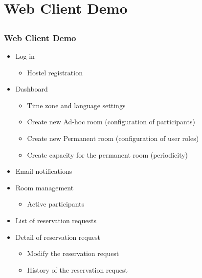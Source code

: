 \documentclass{beamer}
\begin{document}
\section{Web Client Demo}\subsection{}

\begin{frame}
  \frametitle{Web Client Demo}
  \begin{itemize}
    \item Log-in
      \begin{itemize}
        \item Hostel registration    
      \end{itemize}
    \item Dashboard
      \begin{itemize}
        \item Time zone and language settings
        \item Create new Ad-hoc room (configuration of participants)
        \item Create new Permanent room (configuration of user roles)
        \item Create capacity for the permanent room (periodicity)
      \end{itemize}
    \item Email notifications      
    \item Room management
      \begin{itemize}
        \item Active participants
      \end{itemize}    
    \item List of reservation requests
    \item Detail of reservation request
      \begin{itemize}
        \item Modify the reservation request
        \item History of the reservation request        
      \end{itemize}          
  \end{itemize}
\end{frame}
\end{document}
